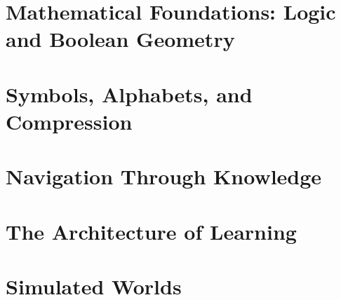 \documentclass[
  12pt,
  twoside,
  openright,
  a4paper
]{book}
\begin{document}
\part{Mathematical Foundations: Logic and Boolean Geometry}


\part{Symbols, Alphabets, and Compression}





\part{Navigation Through Knowledge}





\part{The Architecture of Learning}





\part{Simulated Worlds}




\end{document}
